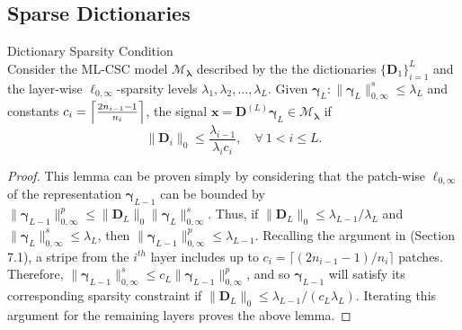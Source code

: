 \documentclass[10pt,journal]{IEEEtran}
\def\x{{\mathbf x}}
\def\D{{\mathbf D}}
\def\M{{\mathcal{M}}}
\def\gama{{\boldsymbol \gamma}}
\def\lamda{{\boldsymbol \lambda}}
\theoremstyle{plain}
\theoremstyle{definition}
\begin{document}
\subsection{Sparse Dictionaries}
\label{app:SparseDictioanries}
\begin{customlemma}{3}{Dictionary Sparsity Condition} \\
	Consider the ML-CSC model $\M_\lamda$ described by the the dictionaries $\{\D_1\}_{i=1}^L$ and the layer-wise $\ell_{0,\infty}$-sparsity levels $\lambda_1,\lambda_2,\dots,\lambda_L$. Given $\gama_L : \|\gama_L\|^s_{0,\infty} \leq \lambda_L$ and constants $c_i = \Bigl\lceil \frac{2n_{i-1}-1}{n_i} \Bigr\rceil$, the signal $\x = \D^{(L)} \gama_L \in \M_\lamda$ if
	\begin{equation}
	\|\D_i\|_0 \leq \frac{\lambda_{i-1}}{\lambda_i c_i}, \quad \forall\ 1<i\leq L.
	\end{equation}
\end{customlemma}

\begin{proof}
	This lemma can be proven simply by considering that the patch-wise $\ell_{0,\infty}$ of the representation $\gama_{L-1}$ can be bounded by $\|\gama_{L-1}\|^p_{0,\infty} \leq \|\D_L\|_0 \|\gama_{L}\|^s_{0,\infty}$. Thus, if $\|\D_L\|_0 \leq \lambda_{L-1} / \lambda_{L}$ and $ \|\gama_{L}\|^s_{0,\infty} \leq \lambda_L$, then $\|\gama_{L-1}\|^p_{0,\infty} \leq \lambda_{L-1}$. Recalling the argument in \cite{Papyan2016convolutional} (Section 7.1), a stripe from the $i^{th}$ layer includes up to $c_i = \lceil (2n_{i-1}-1)/n_i \rceil$ patches. Therefore, $\|\gama_{L-1}\|^s_{0,\infty} \leq c_L \|\gama_{L-1}\|^p_{0,\infty}$, and so $\gama_{L-1}$ will satisfy its corresponding sparsity constraint if $\|\D_L\|_0 \leq \lambda_{L-1} / (c_L \lambda_{L} )$. Iterating this argument for the remaining layers proves the above lemma.
	
\end{proof}
\end{document}
